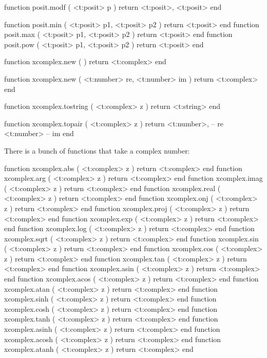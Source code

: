 function posit.modf ( <t:posit> p )
    return
        <t:posit>,
        <t:posit>
end

function posit.min ( <t:posit> p1, <t:posit> p2 ) return <t:posit> end
function posit.max ( <t:posit> p1, <t:posit> p2 ) return <t:posit> end
function posit.pow ( <t:posit> p1, <t:posit> p2 ) return <t:posit> end
\stoptyping


\stopsubsection

\startsubsection[title=Complex numbers]

\starttyping[option=LUA]
function xcomplex.new ( )
    return <t:complex>
end

function xcomplex.new (
    <t:number> re,
    <t:number> im
)
    return <t:complex>
end
\stoptyping

\starttyping[option=LUA]
function xcomplex.tostring ( <t:complex> z )
    return <t:string>
end
\stoptyping

\starttyping[option=LUA]
function xcomplex.topair ( <t:complex> z )
    return
        <t:number>, -- re
        <t:number>  -- im
end
\stoptyping

There is a bunch of functions that take a complex number:

\starttyping[option=LUA]
function xcomplex.abs   ( <t:complex> z ) return <t:complex> end
function xcomplex.arg   ( <t:complex> z ) return <t:complex> end
function xcomplex.imag  ( <t:complex> z ) return <t:complex> end
function xcomplex.real  ( <t:complex> z ) return <t:complex> end
function xcomplex.onj   ( <t:complex> z ) return <t:complex> end
function xcomplex.proj  ( <t:complex> z ) return <t:complex> end
function xcomplex.exp   ( <t:complex> z ) return <t:complex> end
function xcomplex.log   ( <t:complex> z ) return <t:complex> end
function xcomplex.sqrt  ( <t:complex> z ) return <t:complex> end
function xcomplex.sin   ( <t:complex> z ) return <t:complex> end
function xcomplex.cos   ( <t:complex> z ) return <t:complex> end
function xcomplex.tan   ( <t:complex> z ) return <t:complex> end
function xcomplex.asin  ( <t:complex> z ) return <t:complex> end
function xcomplex.acos  ( <t:complex> z ) return <t:complex> end
function xcomplex.atan  ( <t:complex> z ) return <t:complex> end
function xcomplex.sinh  ( <t:complex> z ) return <t:complex> end
function xcomplex.cosh  ( <t:complex> z ) return <t:complex> end
function xcomplex.tanh  ( <t:complex> z ) return <t:complex> end
function xcomplex.asinh ( <t:complex> z ) return <t:complex> end
function xcomplex.acosh ( <t:complex> z ) return <t:complex> end
function xcomplex.atanh ( <t:complex> z ) return <t:complex> end

